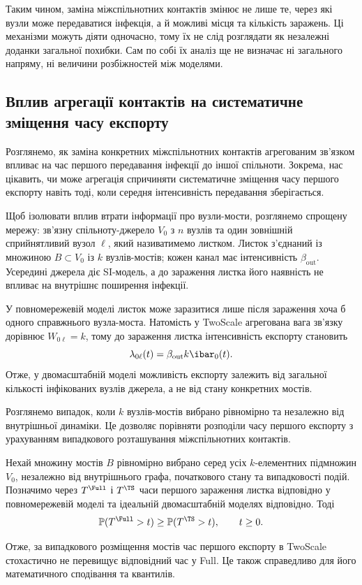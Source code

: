 Таким чином, заміна міжспільнотних контактів змінює не лише те, через які вузли може передаватися інфекція, а й можливі місця та кількість заражень. Ці механізми можуть діяти одночасно, тому їх не слід розглядати як незалежні доданки загальної похибки. Сам по собі їх аналіз ще не визначає ні загального напряму, ні величини розбіжностей між моделями.



\subsection{Вплив агрегації контактів на систематичне зміщення часу експорту}
\label{sec:single_export}

Розглянемо, як заміна конкретних міжспільнотних контактів агрегованим зв'язком впливає на час першого передавання інфекції до іншої спільноти. Зокрема, нас цікавить, чи може агрегація спричиняти систематичне зміщення часу першого експорту навіть тоді, коли середня інтенсивність передавання зберігається.

Щоб ізолювати вплив втрати інформації про вузли-мости, розглянемо спрощену мережу: зв'язну спільноту-джерело $V_0$ з $n$ вузлів та один зовнішній сприйнятливий вузол $\ell$, який називатимемо листком. Листок з'єднаний із множиною $B\subset V_0$ із $k$ вузлів-мостів; кожен канал має інтенсивність $\beta_{\mathrm{out}}$. Усередині джерела діє SI-модель, а до зараження листка його наявність не впливає на внутрішнє поширення інфекції.

У повномережевій моделі листок може заразитися лише після зараження хоча б одного справжнього вузла-моста. Натомість у TwoScale агрегована вага зв'язку дорівнює $W_{0\ell}=k$, тому до зараження листка інтенсивність експорту становить
\[
\lambda_{0\ell}(t)
=
\beta_{\mathrm{out}}k\ibar_0(t).
\]
Отже, у двомасштабній моделі можливість експорту залежить від загальної кількості інфікованих вузлів джерела, а не від стану конкретних мостів.

Розглянемо випадок, коли $k$ вузлів-мостів вибрано рівномірно та незалежно від внутрішньої динаміки. Це дозволяє порівняти розподіли часу першого експорту з урахуванням випадкового розташування міжспільнотних контактів.

\begin{proposition}
\label{prop:ordering}
Нехай множину мостів $B$ рівномірно вибрано серед усіх $k$-елементних підмножин $V_0$, незалежно від внутрішнього графа, початкового стану та випадковості подій. Позначимо через $T^{\Full}$ і $T^{\TS}$ часи першого зараження листка відповідно у повномережевій моделі та ідеальній двомасштабній моделях відповідно. Тоді
\[
\mathbb{P}(T^{\Full}>t)
\geq
\mathbb{P}(T^{\TS}>t),
\qquad t\geq 0.
\]

Отже, за випадкового розміщення мостів час першого експорту в TwoScale стохастично не перевищує відповідний час у Full. Це також справедливо для його математичного сподівання та квантилів.
\end{proposition}

